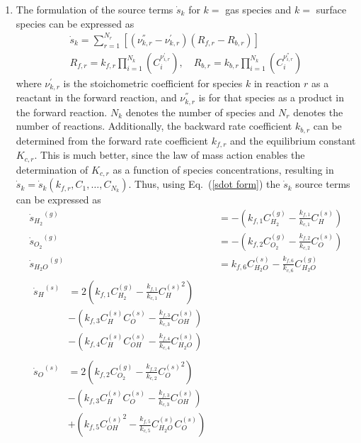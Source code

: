 \documentclass[a4paper]{report}
\newcommand{\eref}[1]{Eq.~(\ref{#1})}
\newcommand{\sk}{\dot{s}_k}
\newcommand{\skg}[1]{{\dot{s}_{#1}}^{(g)}}
\newcommand{\sks}[1]{{\dot{s}_{#1}}^{(s)}}
\newcommand{\kf}[1]{k_{f,#1}}
\newcommand{\kcf}[1]{\frac{k_{f,#1}}{k_{c,#1}}}
\newcommand{\cg}[1]{C_{#1}^{(g)}}
\newcommand{\cs}[1]{C_{#1}^{(s)}}
\begin{document}
\begin{enumerate}
\item
  The formulation of the source terms $\sk$ for $k=$ gas species and $k=$
  surface species can be expressed as
  \begin{equation}
    \label{sdot form}
    \begin{gathered}
      \sk = \sum_{r=1}^{N_r}\left[(\nu_{k,r}^{''} - \nu_{k,r}^{'})
      (R_{f,r} - R_{b,r})\right] \\
      R_{f,r} = k_{f,r}\prod_{i=1}^{N_k}(C_i^{\nu_{i,r}^{'}}), \quad
      R_{b,r} = k_{b,r}\prod_{i=1}^{N_k}(C_i^{\nu_{i,r}^{''}})
    \end{gathered}
  \end{equation}
  where $\nu_{k,r}^{'}$ is the stoichometric coefficient for species $k$ in
  reaction $r$ as a reactant in the forward reaction, and $\nu_{k,r}^{''}$ is
  for that species as a product in the forward reaction.  $N_k$ denotes the
  number of species and $N_r$ denotes the number of reactions.  Additionally,
  the backward rate coefficient $k_{b,r}$ can be determined from the forward
  rate coefficient $k_{f,r}$ and the equilibrium constant $K_{c,r}$.  This is much
  better, since the law of mass action enables the determination of $K_{c,r}$ as
  a function of species concentrations, resulting in $\sk =
  \sk(k_{f,r},C_1,\dots,C_{N_k})$. Thus, using \eref{sdot form} the $\sk$ source
  terms can be expressed as
  \begin{align}
    \skg{H_2}  &= -\left( \kf{1} \cg{H_2} - \kcf{1} \cs{H} \right) \\
    \skg{O_2}  &= -\left( \kf{2} \cg{O_2} - \kcf{2} \cs{O} \right) \\
    \skg{H_2O} &= \kf{6} \cs{H_2O} - \kcf{6} \cg{H_2O} \\
    \begin{split}
      \sks{H}    &= 2 \left( \kf{1} \cg{H_2} - \kcf{1} {\cs{H}}^2 \right) \\
      &-\left( \kf{3} \cs{H} \cs{O} - \kcf{3} \cs{OH} \right) \\
      &-\left( \kf{4} \cs{H} \cs{OH} - \kcf{4} \cs{H_2O} \right)
    \end{split} \\
    \begin{split}
      \sks{O} &= 2 \left( \kf{2} \cg{O_2} - \kcf{2} {\cs{O}}^2 \right) \\
      &-\left( \kf{3} \cs{H} \cs{O} - \kcf{3} \cs{OH} \right) \\
      &+\left( \kf{5} {\cs{OH}}^2 - \kcf{5} \cs{H_2O} \cs{O} \right)
    \end{split} \\

\end{align}
\end{enumerate}
\end{document}
